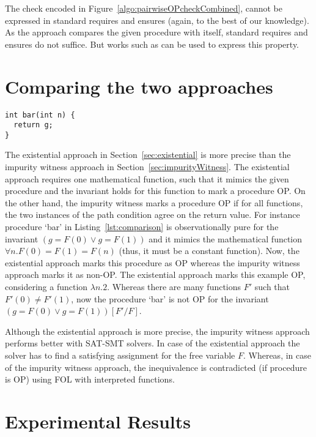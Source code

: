 \documentclass{llncs}
\newcommand{\F}{\mathit{F}}
\begin{document}
The check encoded in Figure~\ref{algo:pairwiseOPcheckCombined}, cannot
be expressed in standard requires and ensures (again, to the best of
our knowledge). As the approach compares the given procedure with
itself, standard requires and ensures do not suffice. But works such as
\cite{lahiri2013differential} can be used to express this property. 

\section{Comparing the two approaches}

\begin{lstlisting}[caption={Procedure `bar': illustrates that
      existential approach is more precise that the impurity witness
      approach.}, label=lst:comparison]
int bar(int n) { 
  return g; 
}
\end{lstlisting}

The existential approach in Section~\ref{sec:existential} is more
precise than the impurity witness approach in
Section~\ref{sec:impurityWitness}. The existential approach requires
one mathematical function, such that it mimics the given procedure and
the invariant holds for this function to mark a procedure OP. On the
other hand, the impurity witness marks a procedure OP if for all
functions, the two instances of the path condition agree on the return
value. For instance procedure `bar' in Listing~\ref{lst:comparison} is
observationally pure for the invariant $(g = \F(0) \vee g = \F(1))$
and it mimics the mathematical function $\forall n. \F(0) = \F(1) =
\F(n)$ (thus, it must be a constant function). Now, the existential
approach marks this procedure as OP whereas the impurity witness
approach marks it as non-OP. The existential approach marks this
example OP, considering a function $\lambda n. 2$. Whereas there are
many functions $\F'$ such that $\F'(0) \neq \F'(1)$, now the procedure
`bar' is not OP for the invariant $(g = \F(0) \vee g = \F(1))[\F'/\F]$.

Although the existential approach is more precise, the impurity
witness approach performs better with SAT-SMT solvers. In case of the
existential approach the solver has to find a satisfying assignment
for the free variable $\F$. Whereas, in case of the impurity witness
approach, the inequivalence is contradicted (if procedure is OP) using
FOL with interpreted functions.

\section{Experimental Results}
\end{document}
